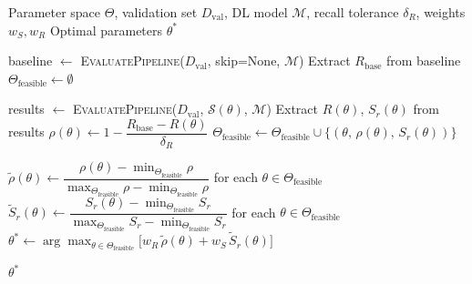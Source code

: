 \documentclass{article}
\begin{document}
\begin{preview}

\setcounter{algorithm}{3} %

\begin{algorithm}[H]
    \caption{Skip Module Hyperparameter Selection}
    \label{alg:hyperparam}
    \begin{algorithmic}[1]

        \Require Parameter space $\Theta$, validation set $D_{\text{val}}$,
        DL model $\mathcal{M}$, recall tolerance $\delta_R$,
        weights $w_S, w_R$
        \Ensure Optimal parameters $\theta^*$

        \State baseline $\gets$ \textsc{EvaluatePipeline}($D_{\text{val}}$, skip=None, $\mathcal{M}$)
        \State Extract $R_{\text{base}}$ from baseline
        \State $\Theta_{\text{feasible}} \gets \emptyset$

            \State results $\gets$ \textsc{EvaluatePipeline}($D_{\text{val}}$, $\mathcal{S}(\theta)$, $\mathcal{M}$)
            \State Extract $R(\theta)$, $S_r(\theta)$ from results
                \State $\rho(\theta) \gets 1 - \dfrac{R_{\text{base}} - R(\theta)}{\delta_R}$
                \State $\Theta_{\text{feasible}} \gets \Theta_{\text{feasible}} \cup \{(\theta,\, \rho(\theta),\, S_r(\theta))\}$
            \EndIf
        \EndFor

        \State $\tilde{\rho}(\theta) \gets \dfrac{\rho(\theta) - \min_{\Theta_{\text{feasible}}}\rho}{\max_{\Theta_{\text{feasible}}}\rho - \min_{\Theta_{\text{feasible}}}\rho}$ \quad for each $\theta \in \Theta_{\text{feasible}}$
        \State $\tilde{S}_r(\theta) \gets \dfrac{S_r(\theta) - \min_{\Theta_{\text{feasible}}}S_r}{\max_{\Theta_{\text{feasible}}}S_r - \min_{\Theta_{\text{feasible}}}S_r}$ \quad for each $\theta \in \Theta_{\text{feasible}}$
        \State $\theta^* \gets \arg\max_{\theta \in \Theta_{\text{feasible}}} \bigl[ w_R\,\tilde{\rho}(\theta) + w_S\,\tilde{S}_r(\theta) \bigr]$

        \State \Return $\theta^*$

    \end{algorithmic}
\end{algorithm}

\end{preview}
\end{document}
